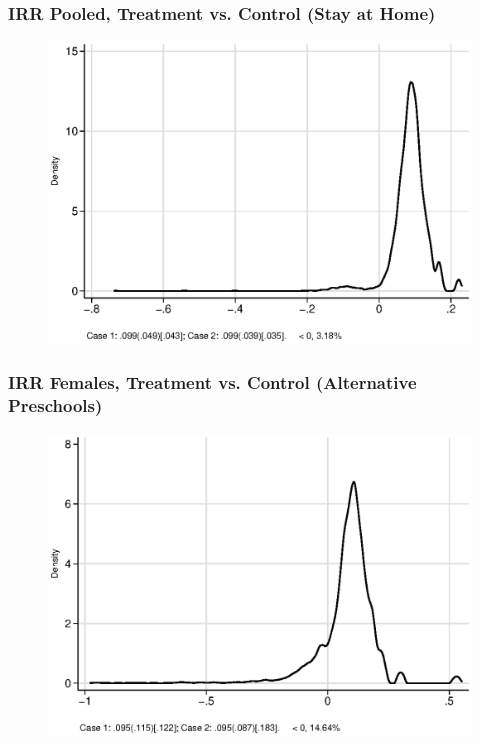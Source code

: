 \documentclass[static]{JJH-Beamer}
\begin{document}
\begin{frame}
\frametitle{IRR Pooled, Treatment vs. Control (Stay at Home)} 
\begin{figure}
	\includegraphics[width=.8\columnwidth]{output/irr_5_sexp.eps}
\end{figure}
\end{frame}


\begin{frame}
\frametitle{IRR Females, Treatment vs. Control (Alternative Preschools)} 
\begin{figure}
	\includegraphics[width=.8\columnwidth]{output/irr_8_sexf.eps}
\end{figure}
\end{frame}

\end{document}
